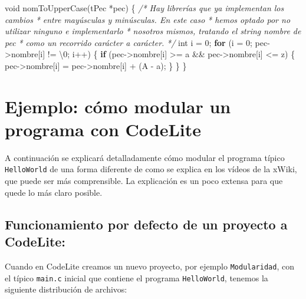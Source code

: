 \documentclass[
]{book}
\newenvironment{Shaded}{\begin{snugshade}}{\end{snugshade}}
\newcommand{\CharTok}[1]{\textcolor[rgb]{0.31,0.60,0.02}{#1}}
\newcommand{\CommentTok}[1]{\textcolor[rgb]{0.56,0.35,0.01}{\textit{#1}}}
\newcommand{\ControlFlowTok}[1]{\textcolor[rgb]{0.13,0.29,0.53}{\textbf{#1}}}
\newcommand{\DataTypeTok}[1]{\textcolor[rgb]{0.13,0.29,0.53}{#1}}
\newcommand{\DecValTok}[1]{\textcolor[rgb]{0.00,0.00,0.81}{#1}}
\newcommand{\NormalTok}[1]{#1}
\begin{document}
\begin{Shaded}
\begin{Highlighting}[]
\DataTypeTok{void}\NormalTok{ nomToUpperCase(tPec *pec) \{}
    \CommentTok{/* Hay librerías que ya implementan los cambios}
\CommentTok{     * entre mayúsculas y minúsculas. En este caso}
\CommentTok{     * hemos optado por no utilizar ninguno e implementarlo}
\CommentTok{     * nosotros mismos, tratando el string nombre de pec}
\CommentTok{     * como un recorrido carácter a carácter.}
\CommentTok{     */}
    \DataTypeTok{int}\NormalTok{ i = }\DecValTok{0}\NormalTok{;}
    \ControlFlowTok{for}\NormalTok{ (i = }\DecValTok{0}\NormalTok{; pec{-}\textgreater{}nombre[i] != }\CharTok{\textquotesingle{}\textbackslash{}0\textquotesingle{}}\NormalTok{; i++) \{}
        \ControlFlowTok{if}\NormalTok{ (pec{-}\textgreater{}nombre[i] \textgreater{}= }\CharTok{\textquotesingle{}a\textquotesingle{}}\NormalTok{ \&\& pec{-}\textgreater{}nombre[i] \textless{}= }\CharTok{\textquotesingle{}z\textquotesingle{}}\NormalTok{) \{}
\NormalTok{            pec{-}\textgreater{}nombre[i] = pec{-}\textgreater{}nombre[i] + (}\CharTok{\textquotesingle{}A\textquotesingle{}}\NormalTok{ {-} }\CharTok{\textquotesingle{}a\textquotesingle{}}\NormalTok{);}
\NormalTok{        \}}
\NormalTok{    \}}
\NormalTok{\}}
\end{Highlighting}
\end{Shaded}

\hypertarget{ejemplo-cuxf3mo-modular-un-programa-con-codelite}{%
\section{Ejemplo: cómo modular un programa con CodeLite}\label{ejemplo-cuxf3mo-modular-un-programa-con-codelite}}

A continuación se explicará detalladamente cómo modular el programa típico \texttt{HelloWorld} de una forma diferente de como se explica en los vídeos de la xWiki, que puede ser más comprensible. La explicación es un poco extensa para que quede lo más claro posible.

\hypertarget{funcionamiento-por-defecto-de-un-proyecto-a-codelite}{%
\subsection{Funcionamiento por defecto de un proyecto a CodeLite:}\label{funcionamiento-por-defecto-de-un-proyecto-a-codelite}}

Cuando en CodeLite creamos un nuevo proyecto, por ejemplo \texttt{Modularidad}, con el típico \texttt{main.c} inicial que contiene el programa \texttt{HelloWorld}, tenemos la siguiente distribución de archivos:
\end{document}
